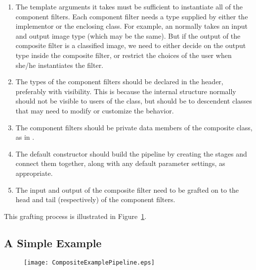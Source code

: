 \begin{enumerate}

\item The template arguments it takes must be sufficient to instantiate all of
the component filters.  Each component filter needs a type supplied by either
the implementor or the enclosing class.  For example, an
 normally takes an input and output image type (which
may be the same).  But if the output of the composite filter is a classified
image, we need to either decide on the output type inside the composite filter,
or restrict the choices of the user when she/he instantiates the filter.

\item The types of the component filters should be declared in the header,
  preferably with  visibility.  This is because the
  internal structure normally should not be visible to users of the class,
  but should be to descendent classes that may need to modify or customize
  the behavior.

\item The component filters should be private data members of the composite
  class, as in .

\item The default constructor should build the pipeline by creating the
  stages and connect them together, along with any default parameter
  settings, as appropriate.

\item The input and output of the composite filter need to be grafted on to
  the head and tail (respectively) of the component filters.

\end{enumerate}

This grafting process is illustrated in Figure~\ref{fig:CompositeExamplePipeline}.


\subsection{A Simple Example}

\begin{figure}
  \centering
  \texttt{[image: CompositeExamplePipeline.eps]}
  \label{fig:CompositeExamplePipeline}
\end{figure}



